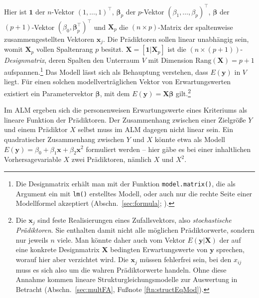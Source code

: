 Hier ist $\bm{1}$ der $n$-Vektor $(1, \ldots, 1)^{\top}$, $\bm{\beta}_{p}$ der $p$-Vektor $(\beta_{1}, \ldots, \beta_{p})^{\top}$, $\bm{\beta}$ der $(p+1)$-Vektor $(\beta_{0},\bm{\beta}_{p}^{\top})^{\top}$ und $\bm{X}_{p}$ die $(n \times p)$-Matrix der spaltenweise zusammengestellten Vektoren $\bm{x}_{j}$. Die Prädiktoren sollen linear unabhängig sein, womit $\bm{X}_{p}$ vollen Spaltenrang $p$ besitzt. $\bm{X} = [\bm{1}|\bm{X}_{p}]$ ist die $(n \times (p+1))$-\emph{Designmatrix}, deren Spalten den Unterraum $V$ mit Dimension $\text{Rang}(\bm{X}) = p + 1$ aufspannen.\footnote{Die Designmatrix erhält man mit der Funktion \lstinline!model.matrix()!, die als Argument ein mit \lstinline!lm()! erstelltes Modell, oder auch nur die rechte Seite einer Modellformel akzeptiert (Abschn.\ \ref{sec:formula}; ).} Das Modell lässt sich als Behauptung verstehen, dass $E(\bm{y})$ in $V$ liegt. Für einen solchen modellverträglichen Vektor von Erwartungswerten existiert ein Parametervektor $\bm{\beta}$, mit dem $E(\bm{y}) = \bm{X} \bm{\beta}$ gilt.\footnote{Die $\bm{x}_{j}$ sind feste Realisierungen eines Zufallsvektors, also \emph{stochastische Prädiktoren}. Sie enthalten damit nicht alle möglichen Prädiktorwerte, sondern nur jeweils $n$ viele. Man könnte daher auch vom Vektor $E(\bm{y} | \bm{X})$ der auf eine konkrete Designmatrix $\bm{X}$ bedingten Erwartungswerte von $\bm{y}$ sprechen, worauf hier aber verzichtet wird. Die $\bm{x}_{j}$ müssen fehlerfrei sein, bei den $x_{ij}$ muss es sich also um die wahren Prädiktorwerte handeln. Ohne diese Annahme kommen lineare Strukturgleichungsmodelle zur Auswertung in Betracht (Abschn.\ \ref{sec:multFA}, Fußnote \ref{ftn:structEqMod}).}

Im ALM ergeben sich die personenweisen Erwartungswerte eines Kriteriums als lineare Funktion der Prädiktoren. Der Zusammenhang zwischen einer Zielgröße $Y$ und einem Prädiktor $X$ selbst muss im ALM dagegen nicht linear sein. Ein quadratischer Zusammenhang zwischen $Y$ und $X$ könnte etwa als Modell $E(\bm{y}) = \beta_{0} + \beta_{1} \bm{x} + \beta_{2} \bm{x}^{2}$ formuliert werden -- hier gäbe es bei einer inhaltlichen Vorhersagevariable $X$ zwei Prädiktoren, nämlich $X$ und $X^{2}$.

